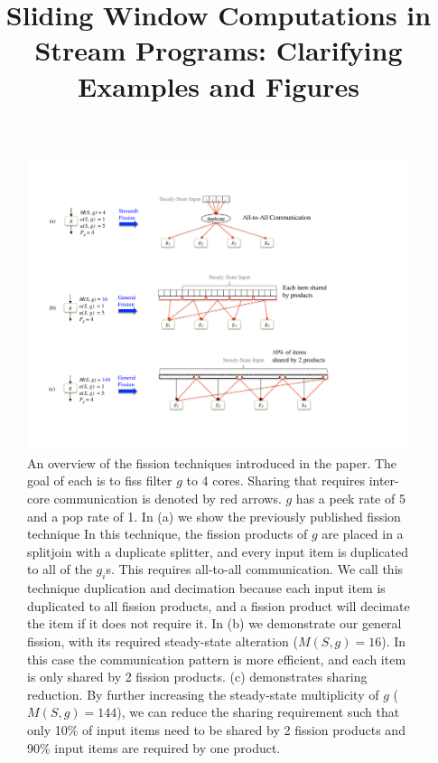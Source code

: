 \documentclass[]{article}
\begin{document}
\title{Sliding Window Computations in Stream Programs: Clarifying Examples and Figures}

\maketitle

\begin{figure}
\centering
\includegraphics[width=\textwidth]{overview.pdf}
\vspace{20pt}
\caption[An overview of fission techniques.]  {
An overview of the fission techniques introduced in the paper.  The
goal of each is to fiss filter $g$ to 4 cores.  Sharing that requires
inter-core communication is denoted by red arrows. $g$ has a peek rate of
5 and a pop rate of 1.  In (a) we show the previously published fission technique
In this technique, the fission products of $g$ are placed in a splitjoin with a duplicate
splitter, and every input item is duplicated to all of the $g_i$s.
This requires all-to-all communication.  We call this technique
duplication and decimation because each input item is duplicated to
all fission products, and a fission product will decimate the item if
it does not require it.  In (b) we demonstrate our general fission, with its required steady-state alteration ($M(S, g) = 16$).  In this case the communication pattern is more efficient, and
each item is only shared by 2 fission products.  (c) demonstrates
sharing reduction.  By further increasing the steady-state
multiplicity of $g$ ($M(S, g) = 144$), we can reduce the sharing
requirement such that only 10\% of input items need to be shared by 2
fission products and 90\% input items are required by one product.
\label{fig:fission-overview}}
\end{figure}
\end{document}
